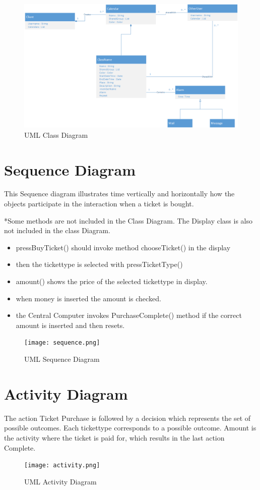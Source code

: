 \begin{figure}[ht!]
\centering
\includegraphics[width=160mm]{class.png}
\caption{UML Class Diagram \label{overflow}}
\end{figure}

\pagebreak \section*{Sequence Diagram}

This Sequence diagram illustrates time vertically and horizontally how the objects participate in the interaction when a ticket is bought.

*Some methods are not included in the Class Diagram. The Display class is also not included in the class Diagram.

\begin{itemize}
	\item pressBuyTicket() should invoke method chooseTicket() in the display
	\item then the tickettype is selected with pressTicketType()
	\item amount() shows the price of the selected tickettype in display.
	\item when money is inserted the amount is checked. 
	\item the Central Computer invokes PurchaseComplete() method if the correct amount is inserted and then resets.
\end{itemize}

\begin{figure}[ht!]
\centering
\texttt{[image: sequence.png]}
\caption{UML Sequence Diagram \label{overflow}}
\end{figure}


\pagebreak \section*{Activity Diagram}

The action Ticket Purchase is followed by a decision which represents the set of possible outcomes. Each tickettype corresponds to a possible outcome. Amount is the activity where the ticket is paid for, which results in the last action Complete.

\begin{figure}[ht!]
\centering
\texttt{[image: activity.png]}
\caption{UML Activity Diagram \label{overflow}}
\end{figure}


